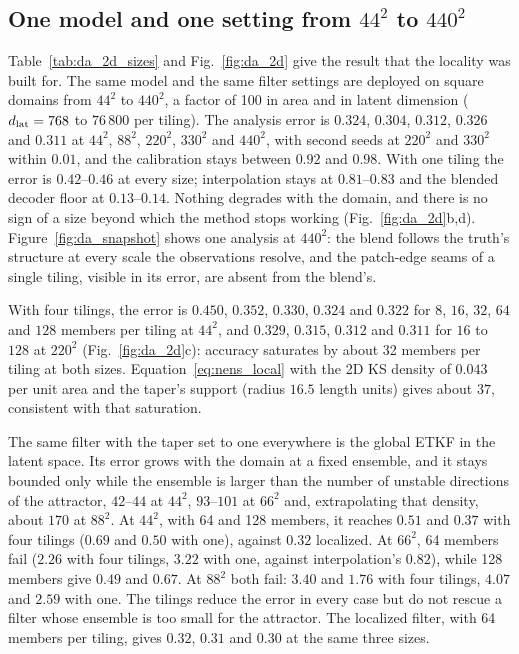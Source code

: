\subsection{One model and one setting from \texorpdfstring{$44^2$ to $440^2$}{44x44 to 440x440}}
\label{sec:da_2d}

Table~\ref{tab:da_2d_sizes} and Fig.~\ref{fig:da_2d} give the result
that the locality was built for. The same model and the same filter
settings are deployed on square domains from $44^2$ to $440^2$, a factor of
100 in area and in latent dimension ($d_{\mathrm{lat}} = 768$ to $76\,800$ per tiling).
The analysis error is $0.324$, $0.304$, $0.312$, $0.326$ and $0.311$ at $44^2$, $88^2$,
$220^2$, $330^2$ and $440^2$, with second seeds at $220^2$ and $330^2$ within $0.01$, and
the calibration stays between $0.92$ and $0.98$. With one tiling the error
is $0.42$--$0.46$ at every size; interpolation stays at $0.81$--$0.83$ and the
blended decoder floor at $0.13$--$0.14$. Nothing degrades with the domain,
and there is no sign of a size beyond which the method stops working
(Fig.~\ref{fig:da_2d}b,d). Figure~\ref{fig:da_snapshot} shows one analysis at $440^2$: the
blend follows the truth's structure at every scale the observations
resolve, and the patch-edge seams of a single tiling, visible in its error,
are absent from the blend's.

 With four tilings, the
error is $0.450$, $0.352$, $0.330$, $0.324$ and $0.322$ for $8$, $16$, $32$, $64$ and $128$
members per tiling at $44^2$, and $0.329$, $0.315$, $0.312$ and $0.311$ for $16$ to $128$ at
$220^2$ (Fig.~\ref{fig:da_2d}c): accuracy saturates by about 32 members per
tiling at both sizes. Equation~\eqref{eq:nens_local} with the 2D KS
density of $0.043$ per unit area and the taper's support (radius $16.5$
length units) gives about $37$, consistent with that saturation.

 The same filter with the taper set to one
everywhere is the global ETKF in the latent space. Its error grows with
the domain at a fixed ensemble, and it stays bounded only while the
ensemble is larger than the number of unstable directions of the
attractor, $42$--$44$ at $44^2$, $93$--$101$ at $66^2$ and, extrapolating that density, about $170$ at $88^2$. At $44^2$,
with 64 and 128 members, it reaches $0.51$ and $0.37$ with four tilings
($0.69$ and $0.50$ with one), against $0.32$ localized. At $66^2$, 64
members fail ($2.26$ with four tilings, $3.22$ with one, against
interpolation's $0.82$), while 128 members give $0.49$ and $0.67$. At
$88^2$ both fail: $3.40$ and $1.76$ with four tilings, $4.07$ and $2.59$ with
one. The tilings reduce the error in every case but do not rescue a filter
whose ensemble is too small for the attractor. The localized filter,
with 64 members per tiling, gives $0.32$, $0.31$ and $0.30$ at the same three
sizes.

